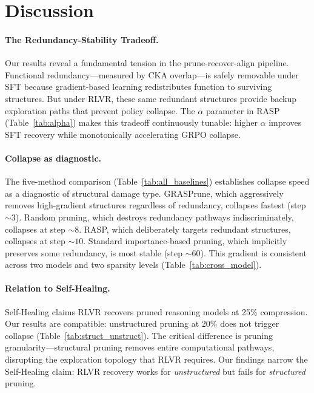 \documentclass[11pt]{article}
\begin{document}
\section{Discussion}

\paragraph{The Redundancy-Stability Tradeoff.}
Our results reveal a fundamental tension in the prune-recover-align pipeline.
Functional redundancy---measured by CKA overlap---is safely removable under SFT because gradient-based learning redistributes function to surviving structures.
But under RLVR, these same redundant structures provide backup exploration paths that prevent policy collapse.
The $\alpha$ parameter in RASP (Table~\ref{tab:alpha}) makes this tradeoff continuously tunable: higher $\alpha$ improves SFT recovery while monotonically accelerating GRPO collapse.

\paragraph{Collapse as diagnostic.}
The five-method comparison (Table~\ref{tab:all_baselines}) establishes collapse speed as a diagnostic of structural damage type.
GRASPrune, which aggressively removes high-gradient structures regardless of redundancy, collapses fastest (step ${\sim}3$).
Random pruning, which destroys redundancy pathways indiscriminately, collapses at step ${\sim}8$.
RASP, which deliberately targets redundant structures, collapses at step ${\sim}10$.
Standard importance-based pruning, which implicitly preserves some redundancy, is most stable (step ${\sim}60$).
This gradient is consistent across two models and two sparsity levels (Table~\ref{tab:cross_model}).

\paragraph{Relation to Self-Healing.}
Self-Healing claims RLVR recovers pruned reasoning models at 25\% compression.
Our results are compatible: unstructured pruning at 20\% does not trigger collapse (Table~\ref{tab:struct_unstruct}).
The critical difference is pruning granularity---structural pruning removes entire computational pathways, disrupting the exploration topology that RLVR requires.
Our findings narrow the Self-Healing claim: RLVR recovery works for \emph{unstructured} but fails for \emph{structured} pruning.
\end{document}
